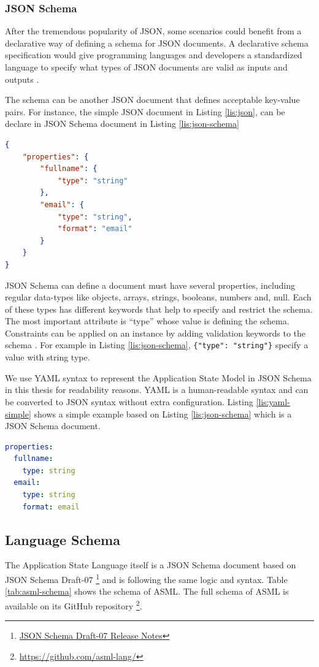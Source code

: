 \subsubsection{JSON Schema}
After the tremendous popularity of JSON, some scenarios could benefit from a declarative way of defining a schema for JSON documents.
A declarative schema specification would give programming languages and developers a standardized language to specify what types of JSON documents are valid as inputs and outputs \cite{json-schema}.

The schema can be another JSON document that defines acceptable key-value pairs.
For instance, the simple JSON document in Listing \ref{lis:json}, can be declare in JSON Schema document in Listing \ref{lis:json-schema}

\lstset{
  label=lis:json-schema, caption=A simple JSON Schema document.
}
\begin{lstlisting}[language=json]
{
    "properties": {
        "fullname": {
            "type": "string"
        },
        "email": {
            "type": "string",
            "format": "email"
        }
    }
}
\end{lstlisting}

JSON Schema can define a document must have several properties, including regular data-types like objects, arrays, strings, booleans, numbers and, null. Each of these types has different keywords that help to specify and restrict the schema. The most important attribute is “type” whose value is defining the schema. Constraints can be applied on an instance by adding validation keywords to the schema \cite{json-model}. For example in Listing \ref{lis:json-schema}, \lstinline[basicstyle=\ttfamily]|{"type": "string"}| specify a value with string type.

We use YAML syntax to represent the Application State Model in JSON Schema in this thesis for readability reasons. YAML is a human-readable syntax and can be converted to JSON syntax without extra configuration. Listing \ref{lis:yaml-simple} shows a simple example based on Listing \ref{lis:json-schema} which is a JSON Schema document.

\lstset{
  label=lis:yaml-simple, caption=Example of expressing JSON Schema in YAML syntax., 
}
\begin{lstlisting}[language=yaml]
properties:
  fullname:
    type: string
  email:
    type: string
    format: email
\end{lstlisting}

\subsection{Language Schema}
The Application State Language itself is a JSON Schema document based on JSON Schema Draft-07
\footnote{\href{https://json-schema.org/draft-07/json-schema-release-notes.html}{JSON Schema Draft-07 Release Notes}}
and is following the same logic and syntax. Table \ref{tab:asml-schema} shows the schema of ASML. 
The full schema of ASML is available on its GitHub repository
\footnote{\href{https://github.com/asml-lang/asml/blob/master/schemas/schema.json}{https://github.com/asml-lang/}}.

